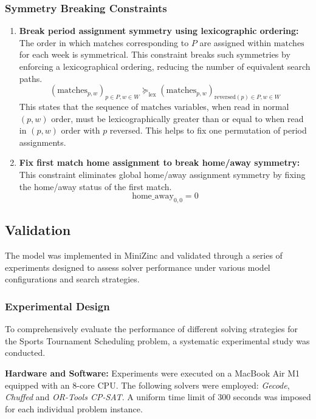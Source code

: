 \subsubsection{Symmetry Breaking Constraints}

\begin{enumerate}
    \item \textbf{Break period assignment symmetry using lexicographic ordering:} The order in which matches corresponding to $P$ are assigned within $\text{matches}$ for each week is symmetrical. This constraint breaks such symmetries by enforcing a lexicographical ordering, reducing the number of equivalent search paths.
    \[ (\text{matches}_{p, w})_{p \in P, w \in W} \succeq_{\text{lex}} (\text{matches}_{p, w})_{\text{reversed}(p) \in P, w \in W} \]
    This states that the sequence of $\text{matches}$ variables, when read in normal $(p,w)$ order, must be lexicographically greater than or equal to when read in $(p,w)$ order with $p$ reversed. This helps to fix one permutation of period assignments.

    \item \textbf{Fix first match home assignment to break home/away symmetry:} This constraint eliminates global home/away assignment symmetry by fixing the home/away status of the first match.
    \[ \text{home\_away}_{0, 0} = 0 \]


\end{enumerate}

\subsection{Validation}

The model was implemented in MiniZinc and validated through a series of experiments designed to assess solver performance under various model configurations and search strategies.

\subsubsection{Experimental Design}

To comprehensively evaluate the performance of different solving strategies for the Sports Tournament Scheduling problem, a systematic experimental study was conducted.

\textbf{Hardware and Software:}
Experiments were executed on a MacBook Air M1 equipped with an 8-core CPU. The following solvers were employed: \textit{Gecode}, \textit{Chuffed} and \textit{OR-Tools CP-SAT}. 
A uniform time limit of $300$ seconds was imposed for each individual problem instance.

